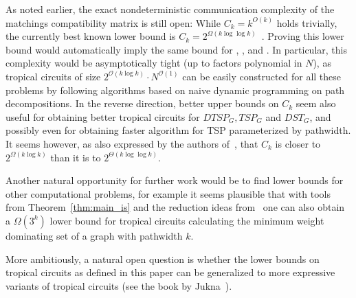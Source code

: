 \documentclass[11pt,a4paper]{article}
\newcommand{\Oh}{\mathcal{O}}
\begin{document}
As noted earlier, the exact nondeterministic communication complexity of the matchings compatibility matrix is still open: While $C_k =k^{O(k)}$ holds trivially, the currently best known lower bound is $C_k = 2^{\Omega(k \log \log k)}$~\cite{raz1995log}. 
Proving this lower bound would automatically imply the same bound for , , and . In particular, this complexity would be asymptotically tight (up to factors polynomial in $N$), as tropical circuits of size $2^{\Oh(k \log k)} \cdot N^{\Oh(1)}$ can be easily constructed for all these problems by following algorithms based on naive dynamic programming on path decompositions.
In the reverse direction, better upper bounds on $C_k$ seem also useful for obtaining better tropical circuits for $DTSP_G,TSP_G$ and $DST_G$, and possibly even for obtaining faster algorithm for TSP parameterized by pathwidth. It seems however, as also expressed by the authors of~\cite{raz1995log}, that $C_k$ is closer to $2^{\Omega(k \log k)}$ than it is to $2^{\Theta(k \log \log k)}$.


Another natural opportunity for further work would be to find lower bounds for other computational problems, for example it seems plausible that with tools from Theorem~\ref{thm:main_is} and the reduction ideas from~\cite{LokshtanovMS18b} one can also obtain a $\Omega(3^k)$ lower bound for tropical circuits calculating the minimum weight dominating set of a graph with pathwidth $k$.

More ambitiously, a natural open question is whether the lower bounds on tropical circuits as defined in this paper can be generalized to more expressive variants of tropical circuits (see the book by Jukna~\cite{Jukna2023}).



\end{document}
